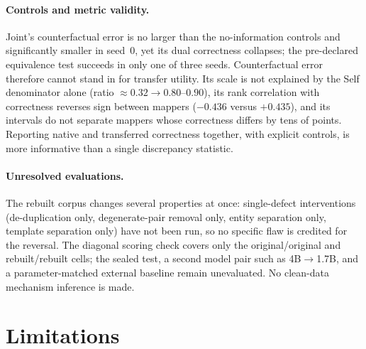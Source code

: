 \documentclass[11pt,twocolumn]{article}
\begin{document}
\paragraph{Controls and metric validity.} Joint's counterfactual error is no
larger than the no-information controls and significantly smaller in seed~0,
yet its dual correctness collapses; the pre-declared equivalence test succeeds
in only one of three seeds. Counterfactual error therefore cannot stand in for
transfer utility. Its scale is not explained by the Self denominator alone
(ratio $\approx0.32\to0.80$--$0.90$), its rank correlation with correctness
reverses sign between mappers ($-0.436$ versus $+0.435$), and its intervals do
not separate mappers whose correctness differs by tens of points. Reporting
native and transferred correctness together, with explicit controls, is more
informative than a single discrepancy statistic.

\paragraph{Unresolved evaluations.} The rebuilt corpus changes several
properties at once: single-defect interventions (de-duplication only,
degenerate-pair removal only, entity separation only, template separation only)
have not been run, so no specific flaw is credited for the reversal. The
diagonal scoring check covers only the original/original and rebuilt/rebuilt
cells; the sealed test, a second model pair such as 4B$\to$1.7B, and a
parameter-matched external baseline remain unevaluated. No clean-data mechanism
inference is made.

\section{Limitations}
\label{sec:limitations}
\end{document}
